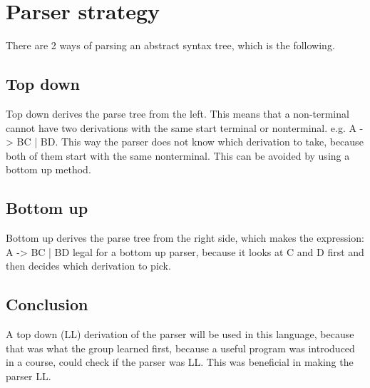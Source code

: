 \section{Parser strategy}
There are 2 ways of parsing an abstract syntax tree, which is the following.
\subsection*{Top down}
Top down derives the parse tree from the left. This means that a non-terminal cannot have two derivations with the same start terminal or nonterminal. e.g. A -> BC | BD. This way the parser does not know which derivation to take, because both of them start with the same nonterminal.
This can be avoided by using a bottom up method.


\subsection*{Bottom up}
Bottom up derives the parse tree from the right side, which makes the expression: A -> BC | BD legal for a bottom up parser, because it looks at C and D first and then decides which derivation to pick.


\subsection*{Conclusion}
A top down (LL) derivation of the parser will be used in this language, because that was what the group learned first, because a useful program was introduced in a course, could check if the parser was LL. This was beneficial in making the parser LL.
